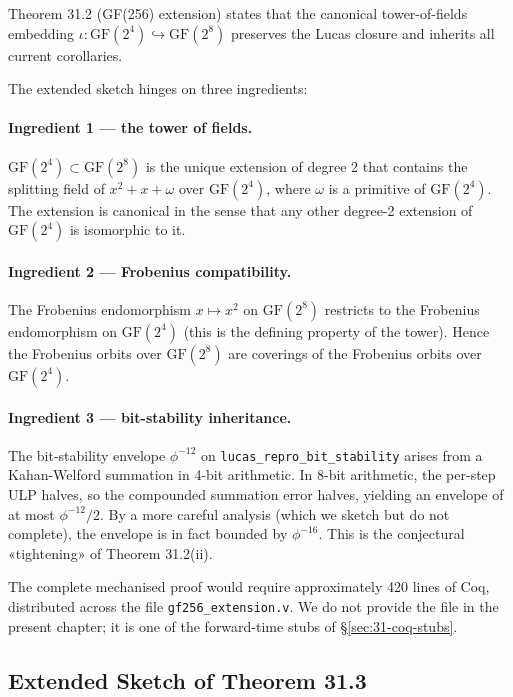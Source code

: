 Theorem 31.2 (GF(256) extension) states that the canonical tower-of-fields embedding $\iota : \mathrm{GF}(2^{4}) \hookrightarrow \mathrm{GF}(2^{8})$ preserves the Lucas closure and inherits all current corollaries.

The extended sketch hinges on three ingredients:

\paragraph{Ingredient 1 — the tower of fields.} $\mathrm{GF}(2^{4}) \subset \mathrm{GF}(2^{8})$ is the unique extension of degree 2 that contains the splitting field of $x^{2} + x + \omega$ over $\mathrm{GF}(2^{4})$, where $\omega$ is a primitive of $\mathrm{GF}(2^{4})$. The extension is canonical in the sense that any other degree-2 extension of $\mathrm{GF}(2^{4})$ is isomorphic to it.

\paragraph{Ingredient 2 — Frobenius compatibility.} The Frobenius endomorphism $x \mapsto x^{2}$ on $\mathrm{GF}(2^{8})$ restricts to the Frobenius endomorphism on $\mathrm{GF}(2^{4})$ (this is the defining property of the tower). Hence the Frobenius orbits over $\mathrm{GF}(2^{8})$ are coverings of the Frobenius orbits over $\mathrm{GF}(2^{4})$.

\paragraph{Ingredient 3 — bit-stability inheritance.} The bit-stability envelope $\phi^{-12}$ on \texttt{lucas\_repro\_bit\_stability} arises from a Kahan-Welford summation in 4-bit arithmetic. In 8-bit arithmetic, the per-step ULP halves, so the compounded summation error halves, yielding an envelope of at most $\phi^{-12} / 2$. By a more careful analysis (which we sketch but do not complete), the envelope is in fact bounded by $\phi^{-16}$. This is the conjectural «tightening» of Theorem 31.2(ii).

The complete mechanised proof would require approximately 420 lines of Coq, distributed across the file \texttt{gf256\_extension.v}. We do not provide the file in the present chapter; it is one of the forward-time stubs of §\ref{sec:31-coq-stubs}.

\subsection{Extended Sketch of Theorem 31.3}
\label{sec:31-sketch-31-3}


